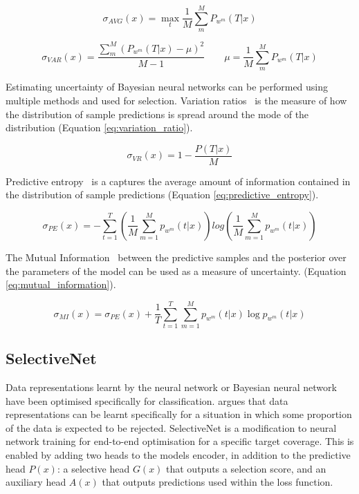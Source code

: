 \begin{equation}
	\sigma_{AVG}(x) = \max_t \frac{1}{M} \sum_m^M P_{w^m}(T|x)
	\label{eq:avg_baysian_neural_network}
\end{equation}

\begin{equation}
	\sigma_{VAR}(x) = \frac{\sum_m^M (P_{w^m}(T|x) - \mu)^2}{M - 1} \qquad \mu = \frac{1}{M} \sum_m^M P_{w^m}(T|x)
	\label{eq:var_baysian_neural_network}
\end{equation}

Estimating uncertainty of Bayesian neural networks can be performed using multiple methods and used for selection. Variation ratios~\citep{freeman1965elementary} is the measure of how the distribution of sample predictions is spread around the mode of the distribution (Equation \ref{eq:variation_ratio}).

\begin{equation}
	\sigma_{VR}(x) = 1 - \frac{P(T|x)}{M}    
	\label{eq:variation_ratio}
\end{equation}

\noindent Predictive entropy~\citep{shannon1948mathematical} is a captures the average amount of information contained in the distribution of sample predictions (Equation \ref{eq:predictive_entropy}). 
   
\begin{equation}
	\sigma_{PE}(x) = -\sum^{T}_{t=1}\left(\frac{1}{M}\sum^{M}_{m=1}p_{w^m}(t|x)\right)log\left(\frac{1}{M}\sum^{M}_{m=1}p_{w^m}(t|x)\right)
	\label{eq:predictive_entropy}
\end{equation}
   
\noindent The Mutual Information~\citep{houlsby2011bayesian} between the predictive samples and the posterior over the parameters of the model can be used as a measure of uncertainty. (Equation \ref{eq:mutual_information}).

\begin{equation}
	\sigma_{MI}(x)=\sigma_{PE}(x)+\frac{1}{T}\sum^{T}_{t=1}\sum^{M}_{m=1}p_{w^m}(t|x)\log p_{w^m}(t|x)
	\label{eq:mutual_information}
\end{equation}

\subsection{SelectiveNet}
\label{subsec:selectivenet}
Data representations learnt by the neural network or Bayesian neural network have been optimised specifically for classification. \cite{Geifman2019Selective} argues that data representations can be learnt specifically for a situation in which some proportion of the data is expected to be rejected. SelectiveNet is a modification to neural network training for end-to-end optimisation for a specific target coverage. This is enabled by adding two heads to the models encoder, in addition to the predictive head $P(x)$: a selective head $G(x)$ that outputs a selection score, and an auxiliary head $A(x)$ that outputs predictions used within the loss function. 

